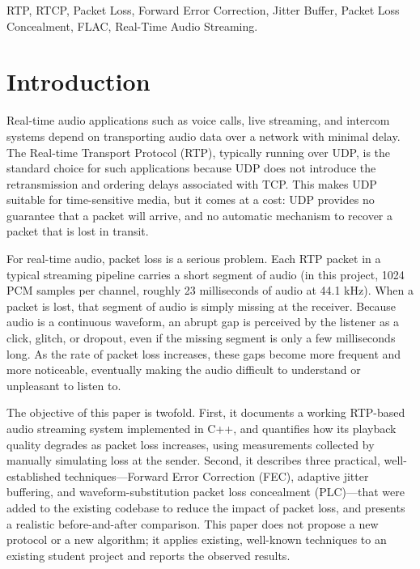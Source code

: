 \documentclass[conference]{IEEEtran}
\begin{document}
\begin{IEEEkeywords}
RTP, RTCP, Packet Loss, Forward Error Correction, Jitter Buffer, Packet Loss Concealment, FLAC, Real-Time Audio Streaming.
\end{IEEEkeywords}

\section{Introduction}

Real-time audio applications such as voice calls, live streaming, and intercom systems depend on transporting audio data over a network with minimal delay. The Real-time Transport Protocol (RTP), typically running over UDP, is the standard choice for such applications because UDP does not introduce the retransmission and ordering delays associated with TCP. This makes UDP suitable for time-sensitive media, but it comes at a cost: UDP provides no guarantee that a packet will arrive, and no automatic mechanism to recover a packet that is lost in transit.

For real-time audio, packet loss is a serious problem. Each RTP packet in a typical streaming pipeline carries a short segment of audio (in this project, 1024 PCM samples per channel, roughly 23 milliseconds of audio at 44.1 kHz). When a packet is lost, that segment of audio is simply missing at the receiver. Because audio is a continuous waveform, an abrupt gap is perceived by the listener as a click, glitch, or dropout, even if the missing segment is only a few milliseconds long. As the rate of packet loss increases, these gaps become more frequent and more noticeable, eventually making the audio difficult to understand or unpleasant to listen to.

The objective of this paper is twofold. First, it documents a working RTP-based audio streaming system implemented in C++, and quantifies how its playback quality degrades as packet loss increases, using measurements collected by manually simulating loss at the sender. Second, it describes three practical, well-established techniques—Forward Error Correction (FEC), adaptive jitter buffering, and waveform-substitution packet loss concealment (PLC)—that were added to the existing codebase to reduce the impact of packet loss, and presents a realistic before-and-after comparison. This paper does not propose a new protocol or a new algorithm; it applies existing, well-known techniques to an existing student project and reports the observed results.
\end{document}
